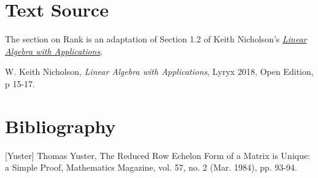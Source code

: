 \documentclass{ximera}
\begin{document}
\section*{Text Source}
The section on Rank is an adaptation of Section 1.2 of Keith Nicholson's \href{https://open.umn.edu/opentextbooks/textbooks/linear-algebra-with-applications}{\it Linear Algebra with Applications}.

W. Keith Nicholson, {\it Linear Algebra with Applications}, Lyryx 2018, Open Edition, p 15-17.

\section*{Bibliography}

[Yuster] Thomas Yuster, The Reduced Row Echelon Form of a Matrix is Unique: a
Simple Proof, Mathematics Magazine, vol. 57, no. 2 (Mar. 1984), pp. 93-94.
\end{document}
